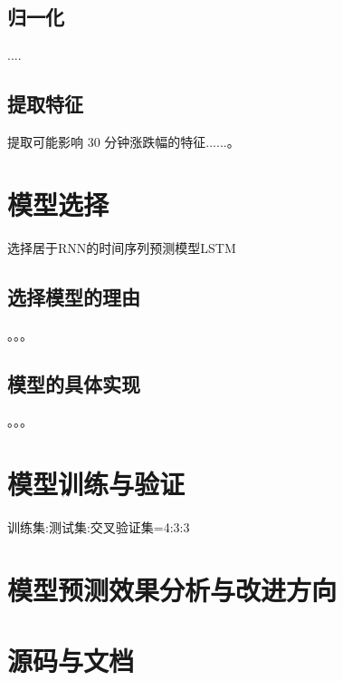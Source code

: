 \documentclass[a4paper,12pt]{ctexart}
\begin{document}
\subsection{归一化}
....
\subsection{提取特征}
提取可能影响 30 分钟涨跌幅的特征......。




\section{模型选择}
选择居于RNN的时间序列预测模型LSTM
\subsection{选择模型的理由}
。。。
\subsection{模型的具体实现}
。。。
\section{模型训练与验证}
训练集:测试集:交叉验证集=4:3:3


\section{模型预测效果分析与改进方向}
\section{源码与文档}
\end{document}
